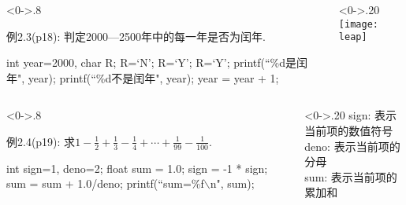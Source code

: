 \begin{frame}[shrink]
\begin{columns}%
	\begin{column}<0->{.8\textwidth}
		\begin{algorithm}[H]  
			\caption{例2.3(p18): 判定2000—2500年中的每一年是否为闰年.} %
			\begin{algorithmic}[1] %
				\State int year=2000, char R; 
				\State R=`N';  
				 R=`Y'; %
				 R=`Y';
				\EndIf
				 printf(``\%d是闰年", year); 
				\Else \quad printf(``\%d不是闰年", year);
				\EndIf	
				\State year = year + 1;
				\EndWhile
			\end{algorithmic}  
		\end{algorithm}
	\end{column}%
	\begin{column}<0->{.20\textwidth}
		\newline
		\newline 
		\newline
		\newline 
		\newline
		\newline 
		\texttt{[image: leap]}
	\end{column}%
\end{columns}
\end{frame}

\begin{frame}%
\begin{columns}%
	\begin{column}<0->{.8\textwidth}
		\begin{algorithm}[H]  
			\caption{例2.4(p19): 求$1-\frac{1}{2}+\frac{1}{3}-\frac{1}{4}+\cdots+\frac{1}{99}-\frac{1}{100}$.} %
			\begin{algorithmic}[1] %
				\State int sign=1, deno=2;
				\State float sum = 1.0; 
				\State sign = -1 * sign;
				\State sum = sum + 1.0/deno;  
				\EndWhile
				\State printf(``sum=\%f$\backslash$n", sum);	
			\end{algorithmic}  
		\end{algorithm}
	\end{column}%
	\begin{column}<0->{.20\textwidth}
		\newline
		\newline
		sign: 表示当前项的数值符号\\
		deno: 表示当前项的分母\\
		sum:  表示当前项的累加和
	\end{column}%
\end{columns}
\end{frame}

